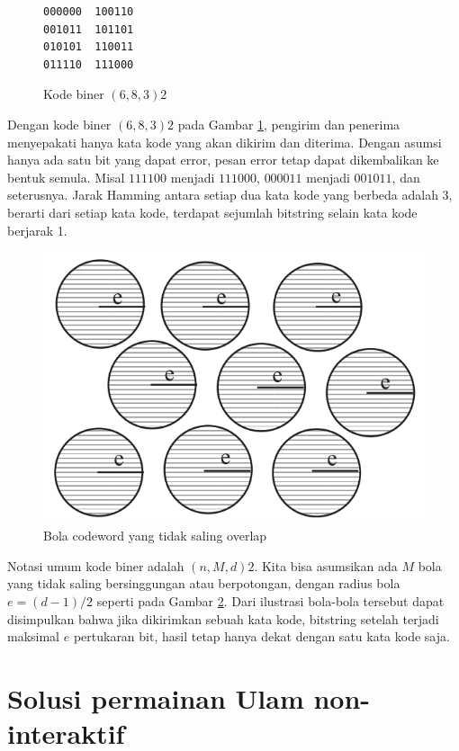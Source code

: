 \documentclass[conference,compsoc]{IEEEtran}
\begin{document}
\begin{figure}
\centering
\begin{BVerbatim}
000000  100110
001011  101101
010101  110011
011110  111000
\end{BVerbatim}
\caption{Kode biner $(6,8,3)2$}
\label{fig:binarycode683}
\end{figure}

Dengan kode biner $(6,8,3)2$ pada Gambar \ref{fig:binarycode683}, pengirim dan penerima menyepakati hanya kata kode yang akan dikirim dan diterima. Dengan asumsi hanya ada satu bit yang dapat error, pesan error tetap dapat dikembalikan ke bentuk semula. Misal $111100$ menjadi $111000$, $000011$ menjadi $001011$, dan seterusnya. Jarak Hamming antara setiap dua kata kode yang berbeda adalah 3, berarti dari setiap kata kode, terdapat sejumlah bitstring selain kata kode berjarak 1.

\begin{figure}
\centering
\includegraphics[width=\linewidth]{../img/codewordsball.png}
\caption{Bola codeword yang tidak saling overlap}
\label{fig:codewordsball}
\end{figure}

Notasi umum kode biner adalah $(n,M,d)2$. Kita bisa asumsikan ada $M$ bola yang tidak saling bersinggungan atau berpotongan, dengan radius bola $e=(d-1)/2$ seperti pada Gambar \ref{fig:codewordsball}. Dari ilustrasi bola-bola tersebut dapat disimpulkan bahwa jika dikirimkan sebuah kata kode, bitstring setelah terjadi maksimal $e$ pertukaran bit, hasil tetap hanya dekat dengan satu kata kode saja.


\section{Solusi permainan Ulam non-interaktif}
\end{document}
